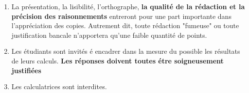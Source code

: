 \documentclass[a4paper,11pt]{article}
\begin{document}
	\noindent{}
\medskip

\bigskip

\begin{enumerate}

\item La présentation, la lisibilité, l'orthographe, \textbf{la qualité de la rédaction et la précision des raisonnements} entreront pour
une part importante dans l'appréciation des copies. Autrement dit, toute rédaction "fumeuse" ou toute justification bancale n'apportera qu'une faible quantité de points.
\item Les étudiants sont invités é encadrer dans la mesure du possible les résultats de leurs calculs. \textbf{Les réponses doivent toutes étre soigneusement justifiées}
\item Les calculatrices sont interdites.
\end{enumerate}







\newpage

	\chead{}\renewcommand{\headrulewidth}{0.4pt}\renewcommand{\footrulewidth}{0.4pt}
	
\end{document}
